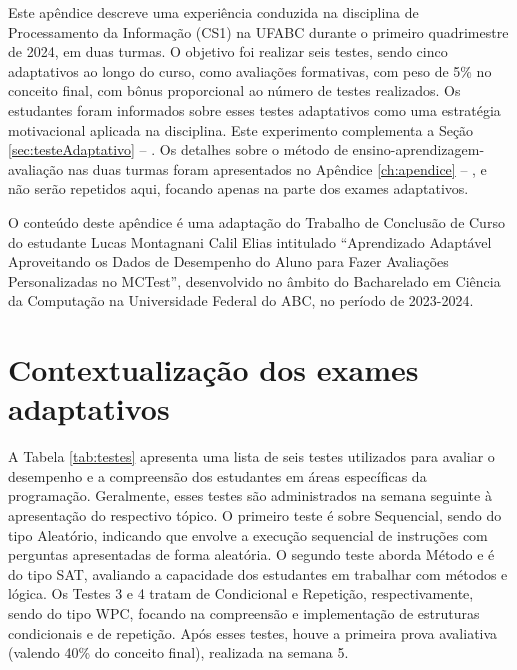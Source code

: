 \label{ch:apendiceB}

Este apêndice descreve uma experiência conduzida na disciplina de Processamento da Informação (CS1) na UFABC durante o primeiro quadrimestre de 2024, em duas turmas. O objetivo foi realizar seis testes, sendo cinco adaptativos ao longo do curso, como avaliações formativas, com peso de 5\% no conceito final, com bônus proporcional ao número de testes realizados. Os estudantes foram informados sobre esses testes adaptativos como uma estratégia motivacional aplicada na disciplina. Este experimento complementa a Seção \ref{sec:testeAdaptativo} -- . Os detalhes sobre o método de ensino-aprendizagem-avaliação nas duas turmas foram apresentados no Apêndice \ref{ch:apendice} -- , e não serão repetidos aqui, focando apenas na parte dos exames adaptativos.

O conteúdo deste apêndice é uma adaptação do Trabalho de Conclusão de Curso do estudante Lucas Montagnani Calil Elias intitulado ``Aprendizado Adaptável Aproveitando os Dados de Desempenho do Aluno para Fazer Avaliações Personalizadas no MCTest'', desenvolvido no âmbito do Bacharelado em Ciência da Computação na Universidade Federal do ABC, no período de 2023-2024.

\section{Contextualização dos exames adaptativos}

A Tabela \ref{tab:testes} apresenta uma lista de seis testes utilizados para avaliar o desempenho e a compreensão dos estudantes em áreas específicas da programação. Geralmente, esses testes são administrados na semana seguinte à apresentação do respectivo tópico. O primeiro teste é sobre Sequencial, sendo do tipo Aleatório, indicando que envolve a execução sequencial de instruções com perguntas apresentadas de forma aleatória. O segundo teste aborda Método e é do tipo SAT, avaliando a capacidade dos estudantes em trabalhar com métodos e lógica. Os Testes 3 e 4 tratam de Condicional e Repetição, respectivamente, sendo do tipo WPC, focando na compreensão e implementação de estruturas condicionais e de repetição. Após esses testes, houve a primeira prova avaliativa (valendo 40\% do conceito final), realizada na semana 5. 

